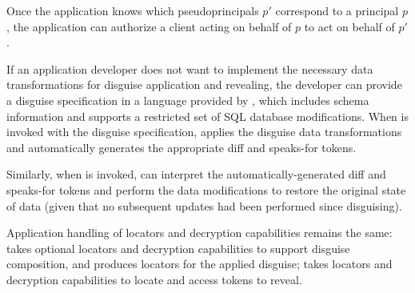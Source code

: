 Once the application knows which pseudoprincipals $p'$ correspond to a principal $p$, the application can
authorize a client acting on behalf of $p$ to act on behalf of $p'$.

If an application developer does not want to implement the necessary data transformations for disguise
application and revealing, the developer can provide a disguise specification in a language provided
by \sys, which includes schema information and supports a restricted set of SQL database
modifications. When  is invoked with the disguise specification, \sys applies the
disguise data transformations and automatically generates the appropriate diff and speaks-for tokens.

Similarly, when  is invoked, \sys can interpret the automatically-generated diff and
speaks-for tokens and perform the data modifications to restore the original state of data (given
that no subsequent updates had been performed since disguising).

Application handling of locators and decryption capabilities remains the same: 
takes optional locators and decryption capabilities to support disguise composition, and produces
locators for the applied disguise;  takes locators and decryption capabilities to
locate and access tokens to reveal.


